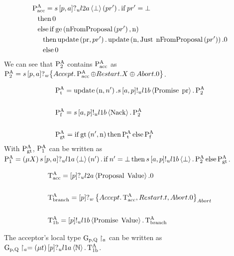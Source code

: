 \begin{align*}
&\operatorname{P^{A}_{acc}} = s\left[p, a\right]?_u l2a \left\langle \bot \right\rangle \left(pr'\right) .
\operatorname{if} pr' = \bot\\
&\hspace*{0.75em * 1}\operatorname{then} 0\\
&\hspace*{0.75em * 1}\operatorname{else} \operatorname{if} \operatorname{ge}\left(\operatorname{nFromProposal}\left(pr' \right), \operatorname{n}\right)\\
&\hspace*{0.75em * 2}\operatorname{then} \operatorname{update} \left(\operatorname{pr}, pr'\right) . \operatorname{update} \left(\operatorname{n}, \operatorname{Just}\; \operatorname{nFromProposal}\left(pr' \right)\right).0\\
&\hspace*{0.75em * 2}\operatorname{else} 0
\end{align*}
We can see that $\operatorname{P^{A}_{2}}$ contains $\operatorname{P^{A}_{acc}}$ as $\operatorname{P^{A}_{2}} = s\left[p, a\right]?_w \big\{\mathnormal{Accept} . \operatorname{P^{A}_{acc}} \oplus \mathnormal{Restart} . X \oplus \mathnormal{Abort} . 0\big\}$.

\begin{align*}
&\operatorname{P^{A}_{t}} = \operatorname{update} \left(\operatorname{n}, n'\right).s\left[a, p\right]!_u l1b \left\langle \operatorname{Promise}\; \operatorname{pr} \right\rangle.\operatorname{P^{A}_{2}}
\\\\
&\operatorname{P^{A}_{f}} = s\left[a, p\right]!_u l1b \left\langle \operatorname{Nack} \right\rangle.\operatorname{P^{A}_{2}}
\\\\
&\operatorname{P^{A}_{gt}} = \operatorname{if} \operatorname{gt}\left(n', \operatorname{n}\right)\operatorname{then} \operatorname{P^{A}_{t}}\operatorname{else} \operatorname{P^{A}_{f}}
\end{align*}
With $\operatorname{P^{A}_{gt}}$, $\operatorname{P^{A}_{1}}$ can be written as $\operatorname{P^{A}_{1}} = \left(\mu X\right)s\left[p, a\right]?_u l1a \left\langle \bot \right\rangle \left(n'\right).\operatorname{if} n'=\bot\operatorname{then} s\left[a, p\right]!_u l1b \left\langle \bot \right\rangle.\operatorname{P^{A}_{2}}\operatorname{else} \operatorname{P^{A}_{gt}}$.

\begin{align*}    
&\operatorname{T^{A}_{acc}} = \left[p\right]?_u l2a \left\langle \operatorname{Proposal}\; \operatorname{Value} \right\rangle.0
\\\\
&\operatorname{T^{A}_{branch}} = \left[p\right]?_w \left\{\mathnormal{Accept} . \operatorname{T^{A}_{acc}} , \mathnormal{Restart} . t , \mathnormal{Abort} .0\right\}_{\mathnormal{Abort}}
\\\\
&\operatorname{T^{A}_{1b}} = \left[p\right]!_u l1b \left\langle \operatorname{Promise}\; \operatorname{Value} \right\rangle . \operatorname{T^{A}_{branch}}
\end{align*}

The acceptor's local type $\operatorname{G_{p, \operatorname{Q}}} \upharpoonright_{a}$ can be written as $\operatorname{G_{p, \operatorname{Q}}} \upharpoonright_{a} = \left(\mu t\right)\left[p\right]?_u l1a \left\langle \mathbb{N} \right\rangle.\operatorname{T^{A}_{1b}}$.

